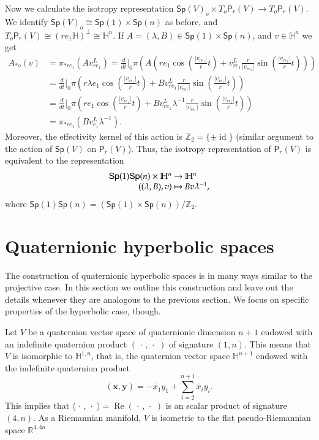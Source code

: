 \documentclass[12pt, a4paper,draft]{amsart}
\newcommand{\id}{\operatorname{id}}
\newcommand{\R}{\mathbb{R}}
\renewcommand{\H}{\mathbb{H}}
\renewcommand{\Re}{\operatorname{Re}}
\newcommand{\Sp}{\mathsf{Sp}}
\theoremstyle{remark}
\begin{document}
Now we calculate the isotropy representation $\Sp(V)_o\times T_o\mathsf{P}_r(V)\to T_o\mathsf{P}_r(V)$.
We identify $\Sp(V)_o\cong \Sp(1)\times\Sp(n)$ as before, and $T_o\mathsf{P}_r(V)\cong(re_1\H)^\perp\cong\H^{n}$.
If $A=(\lambda,B)\in\Sp(1)\times\Sp(n)$, and $v\in\H^n$ we get
\[
\begin{aligned}
A_{*o}(v)
&{}=\pi_{*re_1}(Av_{re_1}^L)
=\frac{d}{dt}\Big\vert_0 \pi\left(A
\left(re_1\cos\left(\frac{\lvert v_{re_1}\rvert}{r}t\right)+v_{re_1}^L\frac{r}{\lvert v_{re_1}\rvert}\sin\left(\frac{\lvert v_{re_1}\rvert}{r}t\right)\right)\right)\\
&{}=\frac{d}{dt}\Big\vert_0 \pi\left(r\lambda e_1\cos\left(\frac{\lvert v_{re_1}\rvert}{r}t\right)+Bv_{re_1}^L\frac{r}{\lvert v_{re_1}\rvert}\sin\left(\frac{\lvert v_{re_1}\rvert}{r}t\right)\right)\\
&{}=\frac{d}{dt}\Big\vert_0 \pi\left(r e_1\cos\left(\frac{\lvert v_{re_1}\rvert}{r}t\right)+Bv_{re_1}^L\lambda^{-1}\frac{r}{\lvert v_{re_1}\rvert}\sin\left(\frac{\lvert v_{re_1}\rvert}{r}t\right)\right)\\[1ex]
&{}=\pi_{*re_1}(Bv_{e_1}^L\lambda^{-1}).
\end{aligned}
\]
Moreover, the effectivity kernel of this action is $\mathbb{Z}_2=\{\pm\id\}$ (similar argument to the action of $\Sp(V)$ on $\mathsf{P}_r(V)$).
Thus, the isotropy representation of $\mathsf{P}_r(V)$ is equivalent to the representation
\[
\begin{array}{r@{\ }c@{\ }l}
\Sp(1)\Sp(n)\times\H^n & \to & \H^n\\
((\lambda,B),v) & \mapsto & Bv\lambda^{-1},
\end{array}
\]
where $\Sp(1)\Sp(n)=(\Sp(1)\times\Sp(n))/\mathbb{Z}_2$.


\section{Quaternionic hyperbolic spaces}

The construction of quaternionic hyperbolic spaces is in many ways similar to the projective case.
In this section we outline this construction and leave out the details whenever they are analogous to the previous section.
We focus on specific properties of the hyperbolic case, though.

Let $V$ be a quaternion vector space of quaternionic dimension $n+1$ endowed with an indefinite quaternion product $(\,\cdot\,,\,\cdot\,\,)$ of signature $(1,n)$.
This means that $V$ is isomorphic to $\H^{1,n}$, that is, the quaternion vector space $\H^{n+1}$ endowed with the indefinite quaternion product 
\[
(\mathbf{x},\mathbf{y})
=-\overline{x}_1{y}_1+\sum_{i=2}^{n+1}\overline{x}_i {y}_i.
\]
This implies that $\langle\,\cdot\,,\,\cdot\,\,\rangle=\Re(\,\cdot\,,\,\cdot\,\,)$ is an scalar product of signature $(4,n)$.
As a Riemannian manifold, $V$ is isometric to the flat pseudo-Riemannian space $\R^{4,4n}$
\end{document}
